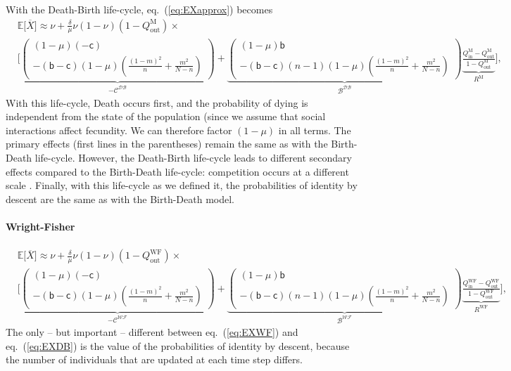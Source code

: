 \documentclass[11pt, letterpaper]{article}
\renewcommand{\eqref}[1]{\textup{{\normalfont eq.~(\ref{#1}}\normalfont)}}
\newcommand{\Esp}[1]{\mathbb{E}\big[ #1\big]}%
\newcommand{\bb}{\mathsf{b}}
\newcommand{\cc}{\mathsf{c}}
\newcommand{\Moran}{\textrm{M}}
\newcommand{\DB}{\textrm{DB}}
\newcommand{\WF}{\textrm{WF}}
\newcommand{\mutbias}{\nu}
\newcommand{\inn}{\textrm{in}}
\newcommand{\out}{\textrm{out}}
\newcommand{\selstr}{\delta}
\begin{document}
With the Death-Birth life-cycle, \eqref{eq:EXapprox} becomes
%
\begin{equation}\label{eq:EXDB}
\begin{split}
& \Esp{\overline{X}} \approx \mutbias + 
 \frac{\selstr}{\mu}  \mutbias (1-\mutbias) (1 - Q_{\out}^{\Moran}) \times \\
 &\Bigg[ \underbrace{ \begin{pmatrix}
 (1-\mu) (-\cc) \\
- (\bb - \cc) (1-\mu) \left( \frac{(1-m)^2}{n} + \frac{m^2}{N-n}\right) 
 \end{pmatrix}
}_{-\mathcal{C^{\DB}}} + \underbrace{ \begin{pmatrix}
(1-\mu) \bb \\
- (\bb - \cc) (n-1) (1-\mu)\left( \frac{(1-m)^2}{n} + \frac{m^2}{N-n} \right) 
\end{pmatrix}
}_{\mathcal{B^{\DB}}} \underbrace{\frac{Q_{\inn}^{\Moran} - Q_{\out}^{\Moran}}{1 - Q_{\out}^{\Moran}}}_{R^{\Moran}} \Bigg],
\end{split}
\end{equation}
%
With this life-cycle, Death occurs first, and the probability of dying is independent from the state of the population (since we assume that social interactions affect fecundity. We can therefore factor $(1-\mu)$ in all terms. The primary effects (first lines in the parentheses) remain the same as with the Birth-Death life-cycle. However, the Death-Birth life-cycle leads to different secondary effects compared to the Birth-Death life-cycle: competition occurs at a different scale \citep{GrafenArchetti2008}.
Finally, with this life-cycle as we defined it, the probabilities of identity by descent are the same as with the Birth-Death model. 

\paragraph{Wright-Fisher}

\begin{equation}\label{eq:EXWF}
\begin{split}
& \Esp{\overline{X}}  \approx \mutbias + 
\frac{\selstr}{\mu}  \mutbias (1-\mutbias) (1 - Q_{\out}^{\WF}) \times \\
 &\Bigg[ \underbrace{ \begin{pmatrix}
 (1-\mu) (-\cc) \\
- (\bb - \cc) (1-\mu) \left( \frac{(1-m)^2}{n} + \frac{m^2}{N-n}\right) 
 \end{pmatrix}
}_{-\mathcal{C^{\WF}}} + \underbrace{ \begin{pmatrix}
(1-\mu) \bb \\
- (\bb - \cc) (n-1)(1-\mu) \left( \frac{(1-m)^2}{n} + \frac{m^2}{N-n} \right) 
\end{pmatrix}
}_{\mathcal{B^{\WF}}} \underbrace{\frac{Q_{\inn}^{\WF} - Q_{\out}^{\WF}}{1 - Q_{\out}^{\WF}}}_{R^{\WF}} \Bigg],
\end{split}
\end{equation}
%
The only -- but important -- different between \eqref{eq:EXWF} and \eqref{eq:EXDB} is the value of the probabilities of identity by descent, because the number of individuals that are updated at each time step differs. 
\end{document}
